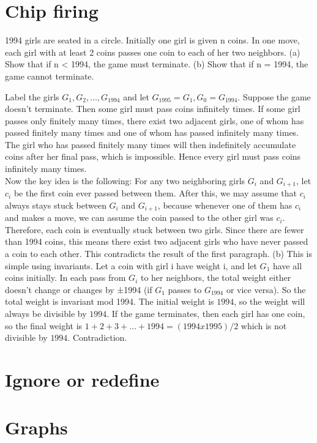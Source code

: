 \section{Chip firing}
\begin{example}[ISL 1994]
1994 girls are seated in a circle. Initially one girl is given n coins. 
In one move, each girl with at least 2 coins passes one coin to each 
of her two neighbors. 
(a) Show that if n < 1994, the game must terminate.
(b) Show that if n = 1994, the game cannot terminate. 
\end{example}
\sol 
Label the girls $G_1, G_2, …, G_{1994}$ and let $G_{1995} = G_1, G_0 = G_{1994}$. 
Suppose the game doesn’t terminate. Then some girl must 
pass coins infinitely times. If some girl passes only finitely 
many times, there exist two adjacent girls, one of whom has 
passed finitely many times and one of whom has passed 
infinitely many times. The girl who has passed finitely many 
times will then indefinitely accumulate coins after her final 
pass, which is impossible. Hence every girl must pass coins 
infinitely many times. 
\\
Now the key idea is the following: For any two neighboring 
girls $G_i$ and $G_{i+1}$, let $c_i$ be the first coin ever passed between 
them. After this, we may assume that $c_i$ always stays stuck 
between $G_i$ and $G_{i+1}$, because whenever one of them has $c_i$ and 
makes a move, we can assume the coin passed to the other girl 
was $c_i$. Therefore, each coin is eventually stuck between two 
girls. Since there are fewer than 1994 coins, this means there 
exist two adjacent girls who have never passed a coin to each 
other. This contradicts the result of the first paragraph. 
(b) This is simple using invariants. Let a coin with girl i have 
weight i, and let $G_1$ have all coins initially. In each pass from $G_i$
to her neighbors, the total weight either doesn’t change or 
changes by ±1994 (if $G_1$ passes to $G_1994$ or vice versa). So the
total weight is invariant mod 1994. The initial weight is $1994$, 
so the weight will always be divisible by $1994$. If the game 
terminates, then each girl has one coin, so the final weight is 
$1+2+3+…+ 1994 = (1994 x 1995)/2$ which is not divisible by 
$1994$. Contradiction.
\section{Ignore or redefine}
\begin{example}
\end{example}
\section{Graphs}

